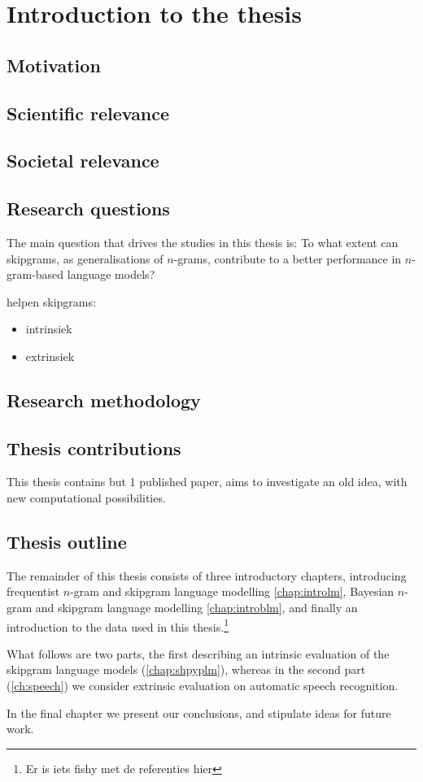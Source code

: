 \chapter{Introduction to the thesis}

\section{Motivation}

\section{Scientific relevance}

\section{Societal relevance}






\section{Research questions}
The main question that drives the studies in this thesis is:
To what extent can skipgrams, as generalisations of $n$-grams, contribute to a better performance in $n$-gram-based language models?

helpen skipgrams:
\begin{itemize}
	\item intrinsiek
	\item extrinsiek
\end{itemize}

\section{Research methodology}

\section{Thesis contributions}
This thesis contains but 1 published paper, aims to investigate an old idea, with new computational possibilities.

\section{Thesis outline}
The remainder of this thesis consists of three introductory chapters, introducing frequentist $n$-gram and skipgram language modelling \cref{chap:introlm}, Bayesian $n$-gram and skipgram language modelling \cref{chap:introblm}, and finally an introduction to the data used in this thesis.\footnote{Er is iets fishy met de referenties hier}

What follows are two parts, the first describing an intrinsic evaluation of the skipgram language models (\cref{chap:shpyplm}), whereas in the second part (\cref{ch:speech}) we consider extrinsic evaluation on automatic speech recognition.

In the final chapter we present our conclusions, and stipulate ideas for future work.

